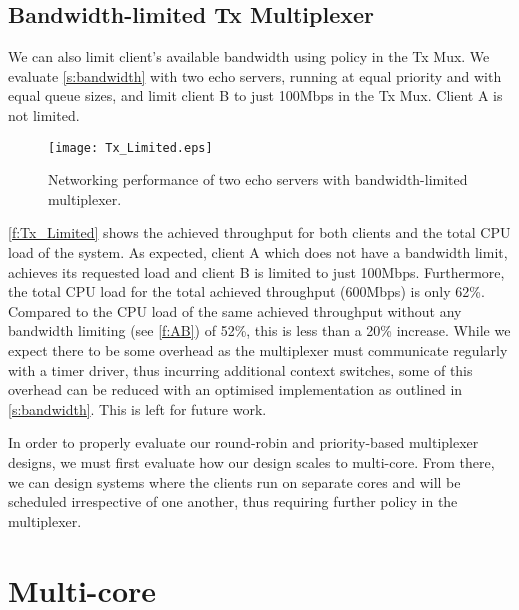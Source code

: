 \subsection{Bandwidth-limited Tx Multiplexer}

We can also limit client's available bandwidth using policy in the Tx Mux. We evaluate \autoref{s:bandwidth} with two echo servers,
running at equal priority and with equal queue sizes, and limit client B to just 100Mbps in the Tx Mux. Client A is not limited.

\begin{figure}[H]
    \centering
    \texttt{[image: Tx\_Limited.eps]}
    \caption{Networking performance of two echo servers with bandwidth-limited multiplexer.}
    \label{f:Tx_Limited}
\end{figure}

\autoref{f:Tx_Limited} shows the achieved throughput for both clients and the total CPU load of the system. As expected, 
client A which does not have a bandwidth limit, achieves its requested load and client B is limited to just 100Mbps. Furthermore, 
the total CPU load for the total achieved throughput (600Mbps) is only 62\%. Compared to the CPU load of the same 
achieved throughput without any bandwidth limiting (see \autoref{f:AB}) of 52\%, this is less than a 20\% increase. While we
expect there to be some overhead as the multiplexer must communicate regularly with a timer driver, thus incurring additional
context switches, some of this overhead can be reduced with an optimised implementation 
as outlined in \autoref{s:bandwidth}. This is left for future work.

In order to properly evaluate our round-robin and priority-based multiplexer designs, we must first evaluate how our
design scales to multi-core. From there, we can design systems where the clients run on separate cores and will be scheduled irrespective
of one another, thus requiring further policy in the multiplexer.

\section{Multi-core}

